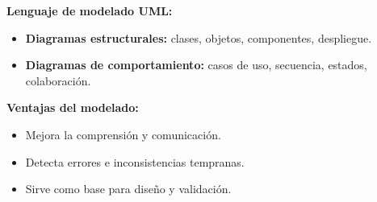     \textbf{Lenguaje de modelado UML:}

    \begin{itemize}

        \item \textbf{Diagramas estructurales:} clases, objetos, componentes, despliegue.

        \item \textbf{Diagramas de comportamiento:} casos de uso, secuencia, estados, colaboración.

    \end{itemize}


    \textbf{Ventajas del modelado:}

    \begin{itemize}

        \item Mejora la comprensión y comunicación.

        \item Detecta errores e inconsistencias tempranas.

        \item Sirve como base para diseño y validación.

    \end{itemize}


